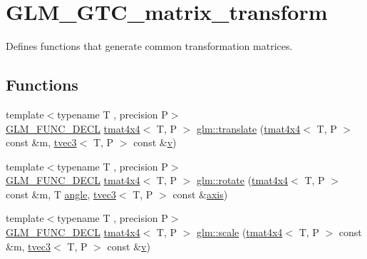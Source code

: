 \hypertarget{group__gtc__matrix__transform}{}\section{G\+L\+M\+\_\+\+G\+T\+C\+\_\+matrix\+\_\+transform}
\label{group__gtc__matrix__transform}


Defines functions that generate common transformation matrices.  


\subsection*{Functions}
\begin{DoxyCompactItemize}
\item 
{\footnotesize template$<$typename T , precision P$>$ }\\\mbox{\hyperlink{setup_8hpp_ab2d052de21a70539923e9bcbf6e83a51}{G\+L\+M\+\_\+\+F\+U\+N\+C\+\_\+\+D\+E\+CL}} \mbox{\hyperlink{structglm_1_1tmat4x4}{tmat4x4}}$<$ T, P $>$ \mbox{\hyperlink{group__gtc__matrix__transform_gaee134ab77c6c5548a6ebf4e8e476c6ed}{glm\+::translate}} (\mbox{\hyperlink{structglm_1_1tmat4x4}{tmat4x4}}$<$ T, P $>$ const \&m, \mbox{\hyperlink{structglm_1_1tvec3}{tvec3}}$<$ T, P $>$ const \&\mbox{\hyperlink{glad_8h_a14cfbe2fc2234f5504618905b69d1e06}{v}})
\item 
{\footnotesize template$<$typename T , precision P$>$ }\\\mbox{\hyperlink{setup_8hpp_ab2d052de21a70539923e9bcbf6e83a51}{G\+L\+M\+\_\+\+F\+U\+N\+C\+\_\+\+D\+E\+CL}} \mbox{\hyperlink{structglm_1_1tmat4x4}{tmat4x4}}$<$ T, P $>$ \mbox{\hyperlink{group__gtc__matrix__transform_ga161b1df124348f232d994ba7958e4815}{glm\+::rotate}} (\mbox{\hyperlink{structglm_1_1tmat4x4}{tmat4x4}}$<$ T, P $>$ const \&m, T \mbox{\hyperlink{group__gtc__quaternion_gad4a4448baedb198b2b1e7880d2544dc9}{angle}}, \mbox{\hyperlink{structglm_1_1tvec3}{tvec3}}$<$ T, P $>$ const \&\mbox{\hyperlink{group__gtc__quaternion_ga0b3e87a13b2708154b72259e50789a19}{axis}})
\item 
{\footnotesize template$<$typename T , precision P$>$ }\\\mbox{\hyperlink{setup_8hpp_ab2d052de21a70539923e9bcbf6e83a51}{G\+L\+M\+\_\+\+F\+U\+N\+C\+\_\+\+D\+E\+CL}} \mbox{\hyperlink{structglm_1_1tmat4x4}{tmat4x4}}$<$ T, P $>$ \mbox{\hyperlink{group__gtc__matrix__transform_ga8f062fcc07e2445500793f2803afebb0}{glm\+::scale}} (\mbox{\hyperlink{structglm_1_1tmat4x4}{tmat4x4}}$<$ T, P $>$ const \&m, \mbox{\hyperlink{structglm_1_1tvec3}{tvec3}}$<$ T, P $>$ const \&\mbox{\hyperlink{glad_8h_a14cfbe2fc2234f5504618905b69d1e06}{v}})

\end{DoxyCompactItemize}
